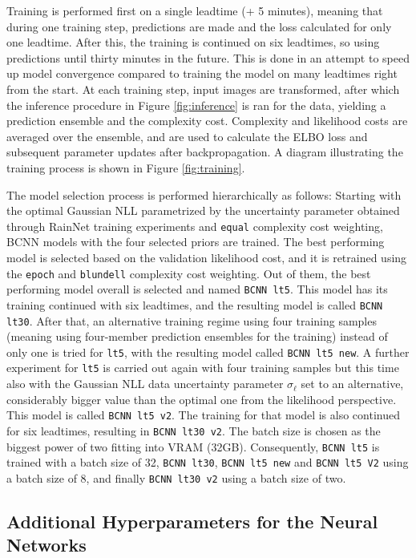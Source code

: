 Training is performed first on a single leadtime (+ 5 minutes), meaning that during one training step, predictions are made and the loss calculated for only one leadtime. After this, the training is continued on six leadtimes, so using predictions until thirty minutes in the future. This is done in an attempt to speed up model convergence compared to training the model on many leadtimes right from the start. At each training step, input images are transformed, after which the inference procedure in Figure \ref{fig:inference} is ran for the data, yielding a prediction ensemble and the complexity cost. Complexity and likelihood costs are averaged over the ensemble, and are used to calculate the ELBO loss and subsequent parameter updates after backpropagation. A diagram illustrating the training process is shown in Figure \ref{fig:training}. 

The model selection process is performed hierarchically as follows: Starting with the optimal Gaussian NLL parametrized by the uncertainty parameter obtained through RainNet training experiments and \texttt{equal} complexity cost weighting, BCNN models with the four selected priors are trained. The best performing model is selected based on the validation likelihood cost, and it is retrained using the \texttt{epoch} and \texttt{blundell} complexity cost weighting. Out of them, the best performing model overall is selected and named \texttt{BCNN lt5}. This model has its training continued with six leadtimes, and the resulting model is called \texttt{BCNN lt30}. After that, an alternative training regime using four training samples (meaning using four-member prediction ensembles for the training) instead of only one is tried for \texttt{lt5}, with the resulting model called \texttt{BCNN lt5 new}. A further experiment for \texttt{lt5} is carried out again with four training samples but this time also with the Gaussian NLL data uncertainty parameter $\sigma_\ell$ set to an alternative, considerably bigger value than the optimal one from the likelihood perspective. This model is called \texttt{BCNN lt5 v2}. The training for that model is also continued for six leadtimes, resulting in \texttt{BCNN lt30 v2}. The batch size is chosen as the biggest power of two fitting into VRAM (32GB). 
Consequently, \texttt{BCNN lt5} is trained with a batch size of 32, \texttt{BCNN lt30}, \texttt{BCNN lt5 new} and \texttt{BCNN lt5 V2} using a batch size of 8, and finally \texttt{BCNN lt30 v2} using a batch size of two.

\subsection{Additional Hyperparameters for the Neural Networks}
\label{section:hyper}

